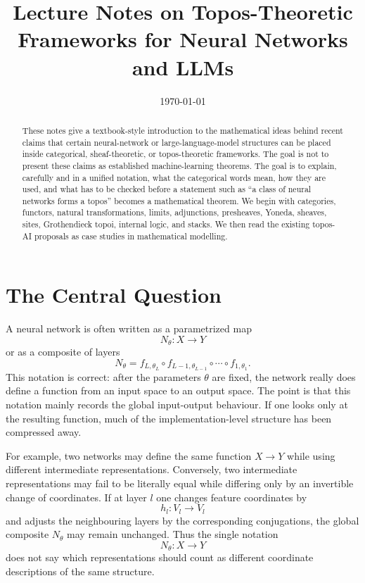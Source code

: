 \documentclass[11pt]{article}
\title{Lecture Notes on Topos-Theoretic Frameworks for Neural Networks and LLMs}
\author{}
\date{\today}
\begin{document}
\maketitle

\begin{abstract}
These notes give a textbook-style introduction to the mathematical ideas behind
recent claims that certain neural-network or large-language-model structures can
be placed inside categorical, sheaf-theoretic, or topos-theoretic frameworks.
The goal is not to present these claims as established machine-learning
theorems. The goal is to explain, carefully and in a unified notation, what the
categorical words mean, how they are used, and what has to be checked before a
statement such as ``a class of neural networks forms a topos'' becomes a
mathematical theorem. We begin with categories, functors, natural
transformations, limits, adjunctions, presheaves, Yoneda, sheaves, sites,
Grothendieck topoi, internal logic, and stacks. We then read the existing
topos-AI proposals as case studies in mathematical modelling.
\end{abstract}

\section{The Central Question}

A neural network is often written as a parametrized map
\[
N_\theta:X\longrightarrow Y
\]
or as a composite of layers
\[
N_\theta=f_{L,\theta_L}\circ f_{L-1,\theta_{L-1}}\circ\cdots\circ f_{1,\theta_1}.
\]
This notation is correct: after the parameters \(\theta\) are fixed, the network
really does define a function from an input space to an output space. The point
is that this notation mainly records the global input-output behaviour. If one
looks only at the resulting function, much of the implementation-level
structure has been compressed away.

For example, two networks may define the same function \(X\to Y\) while using
different intermediate representations. Conversely, two intermediate
representations may fail to be literally equal while differing only by an
invertible change of coordinates. If at layer \(l\) one changes feature
coordinates by
\[
h_l:V_l\longrightarrow V_l
\]
and adjusts the neighbouring layers by the corresponding conjugations, the
global composite \(N_\theta\) may remain unchanged. Thus the single notation
\[
N_\theta:X\to Y
\]
does not say which representations should count as different coordinate
descriptions of the same structure.
\end{document}
